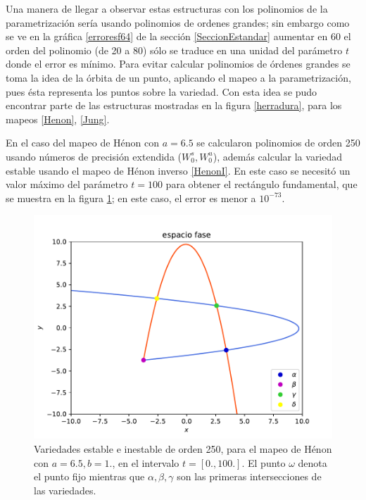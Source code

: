 Una manera de llegar a observar estas estructuras con los polinomios de la pa\-ra\-me\-tri\-za\-ción sería usando polinomios de ordenes grandes; sin embargo como se ve en la gráfica \ref{erroresf64} de la sección \ref{SeccionEstandar} aumentar en 60 el orden del polinomio (de 20 a 80) sólo se traduce en una unidad del parámetro $t$ donde el error es mínimo. Para evitar calcular polinomios de órdenes grandes se toma la idea de la órbita de un punto, aplicando el mapeo a la parametrización, pues ésta representa los puntos sobre la variedad. Con esta idea se pudo encontrar parte de las estructuras mostradas en la figura \ref{herradura}, para los mapeos \eqref{Henon}, \eqref{Jung}.


En el caso del mapeo de Hénon con $a=6.5$ se calcularon polinomios de orden 250 usando números de precisión extendida ($W_{0}^{s},W_{0}^{u}$), además calcular la variedad estable usando el mapeo de Hénon inverso \eqref{HenonI}. En este caso se necesitó un valor máximo del parámetro $t=100$ para obtener el rectángulo fundamental, que se muestra en la figura \ref{rectangulo0}; en este caso, el error es menor a $10^{-73}$.

\begin{figure}[H]
\centering
\includegraphics[scale=0.7]{rectangulo_fundamental}
\caption{Variedades estable e inestable de orden 250, para el mapeo de Hénon con $a=6.5,b=1.$, en el intervalo $t=[0.,100.]$. El punto $\omega$ denota el punto fijo mientras que $\alpha, \beta, \gamma$ son las primeras intersecciones de las variedades.}
\label{rectangulo0}
\end{figure}


